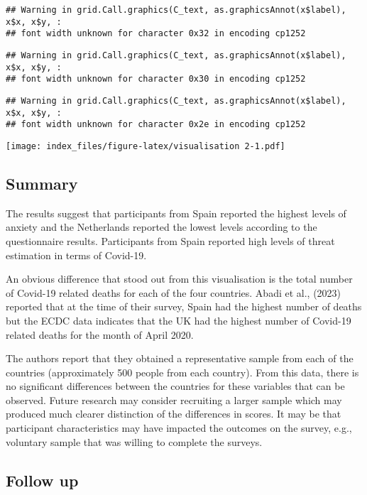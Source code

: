 \documentclass[
]{article}
\begin{document}
\begin{verbatim}
## Warning in grid.Call.graphics(C_text, as.graphicsAnnot(x$label), x$x, x$y, :
## font width unknown for character 0x32 in encoding cp1252
\end{verbatim}

\begin{verbatim}
## Warning in grid.Call.graphics(C_text, as.graphicsAnnot(x$label), x$x, x$y, :
## font width unknown for character 0x30 in encoding cp1252
\end{verbatim}

\begin{verbatim}
## Warning in grid.Call.graphics(C_text, as.graphicsAnnot(x$label), x$x, x$y, :
## font width unknown for character 0x2e in encoding cp1252
\end{verbatim}

\texttt{[image: index\_files/figure-latex/visualisation 2-1.pdf]}

\subsection{Summary}\label{summary}

The results suggest that participants from Spain reported the highest
levels of anxiety and the Netherlands reported the lowest levels
according to the questionnaire results. Participants from Spain reported
high levels of threat estimation in terms of Covid-19.

An obvious difference that stood out from this visualisation is the
total number of Covid-19 related deaths for each of the four countries.
Abadi et al., (2023) reported that at the time of their survey, Spain
had the highest number of deaths but the ECDC data indicates that the UK
had the highest number of Covid-19 related deaths for the month of April
2020.

The authors report that they obtained a representative sample from each
of the countries (approximately 500 people from each country). From this
data, there is no significant differences between the countries for
these variables that can be observed. Future research may consider
recruiting a larger sample which may produced much clearer distinction
of the differences in scores. It may be that participant characteristics
may have impacted the outcomes on the survey, e.g., voluntary sample
that was willing to complete the surveys.

\subsection{Follow up}\label{follow-up}
\end{document}
